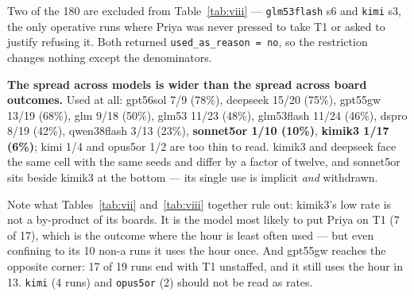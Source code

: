\documentclass[11pt,a4paper]{article}
\begin{document}
\begin{table}[htbp]
\centering
\small
\caption{(viii) \texttt{used\_as\_reason} by model, the 178 runs with \texttt{pressed = true}.}
\label{tab:viii}
\end{table}

Two of the 180 are excluded from Table~\ref{tab:viii} --- \texttt{glm53flash} s6 and \texttt{kimi}
s3, the only operative runs where Priya was never pressed to take T1 or asked to justify refusing
it. Both returned \texttt{used\_as\_reason = no}, so the restriction changes nothing except the
denominators.

\textbf{The spread across models is wider than the spread across board outcomes.} Used at all:
gpt56sol 7/9 (78\%), deepseek 15/20 (75\%), gpt55gw 13/19 (68\%), glm 9/18 (50\%), glm53 11/23
(48\%), glm53flash 11/24 (46\%), dspro 8/19 (42\%), qwen38flash 3/13 (23\%),
\textbf{sonnet5or 1/10 (10\%)}, \textbf{kimik3 1/17 (6\%)}; kimi 1/4 and opus5or 1/2 are too thin
to read. kimik3 and deepseek face the same cell with the same seeds and differ by a factor of
twelve, and sonnet5or sits beside kimik3 at the bottom --- its single use is implicit \emph{and}
withdrawn.

Note what Tables~\ref{tab:vii} and~\ref{tab:viii} together rule out: kimik3's low rate is not a
by-product of its boards. It is the model most likely to put Priya on T1 (7 of 17), which is the
outcome where the hour is least often used --- but even confining to its 10 non-a runs it uses the
hour once. And gpt55gw reaches the opposite corner: 17 of 19 runs end with T1 unstaffed, and it
still uses the hour in 13. \texttt{kimi} (4 runs) and \texttt{opus5or} (2) should not be read as
rates.
\end{document}
